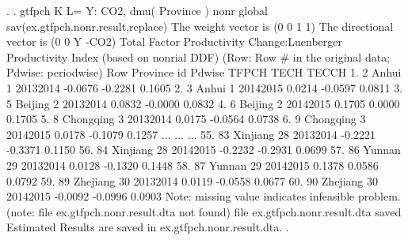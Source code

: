 . 
. gtfpch K L= Y: CO2, dmu( Province ) nonr  global sav(ex.gtfpch.nonr.result,replace)
{\smallskip}
 The weight vector is (0 0 1 1)
{\smallskip}
 The directional vector is (0 0 Y -CO2)
{\smallskip}
{\smallskip}
 Total Factor Productivity Change:Luenberger Productivity Index (based on nonrial DDF)
    (Row: Row \# in the original data; Pdwise: periodwise)
{\smallskip}
     {\TLC}
     {\VBAR} Row       Province   id      Pdwise     TFPCH      TECH    TECCH {\VBAR}
     {\LFTT}
  1. {\VBAR}   2          Anhui    1   2013{\tytilde}2014   -0.0676   -0.2281   0.1605 {\VBAR}
  2. {\VBAR}   3          Anhui    1   2014{\tytilde}2015    0.0214   -0.0597   0.0811 {\VBAR}
  3. {\VBAR}   5        Beijing    2   2013{\tytilde}2014    0.0832   -0.0000   0.0832 {\VBAR}
  4. {\VBAR}   6        Beijing    2   2014{\tytilde}2015    0.1705    0.0000   0.1705 {\VBAR}
  5. {\VBAR}   8      Chongqing    3   2013{\tytilde}2014    0.0175   -0.0564   0.0738 {\VBAR}
  6. {\VBAR}   9      Chongqing    3   2014{\tytilde}2015    0.0178   -0.1079   0.1257 {\VBAR}
                                     ...
                                     ...
                                     ...
 55. {\VBAR}  83       Xinjiang   28   2013{\tytilde}2014   -0.2221   -0.3371   0.1150 {\VBAR}
 56. {\VBAR}  84       Xinjiang   28   2014{\tytilde}2015   -0.2232   -0.2931   0.0699 {\VBAR}
 57. {\VBAR}  86         Yunnan   29   2013{\tytilde}2014    0.0128   -0.1320   0.1448 {\VBAR}
 58. {\VBAR}  87         Yunnan   29   2014{\tytilde}2015    0.1378    0.0586   0.0792 {\VBAR}
 59. {\VBAR}  89       Zhejiang   30   2013{\tytilde}2014    0.0119   -0.0558   0.0677 {\VBAR}
 60. {\VBAR}  90       Zhejiang   30   2014{\tytilde}2015   -0.0092   -0.0996   0.0903 {\VBAR}
     {\BLC}
Note: missing value indicates infeasible problem.
(note: file ex.gtfpch.nonr.result.dta not found)
file ex.gtfpch.nonr.result.dta saved
{\smallskip}
Estimated Results are saved in ex.gtfpch.nonr.result.dta.
{\smallskip}
. 
